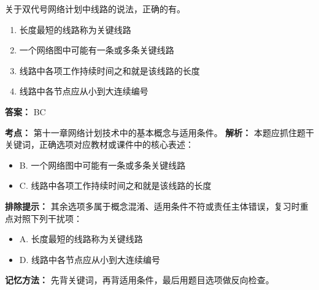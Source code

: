 \documentclass[UTF8,fontset=fandol,11pt]{ctexart}
\begin{document}
\begin{quizbox}[title={第 12 题}]
关于双代号网络计划中线路的说法，正确的有。\\
\begin{enumerate}[label=\Alph*.]
\item 长度最短的线路称为关键线路
\item 一个网络图中可能有一条或多条关键线路
\item 线路中各项工作持续时间之和就是该线路的长度
\item 线路中各节点应从小到大连续编号
\end{enumerate}
\textbf{答案：} BC
\vspace{0.25em}
\begin{answerbox}[title={考点解析}]
\textbf{考点：} 第十一章网络计划技术中的基本概念与适用条件。
\textbf{解析：} 本题应抓住题干关键词，正确选项对应教材或课件中的核心表述：
\begin{itemize}
\item B. 一个网络图中可能有一条或多条关键线路
\item C. 线路中各项工作持续时间之和就是该线路的长度
\end{itemize}
\textbf{排除提示：} 其余选项多属于概念混淆、适用条件不符或责任主体错误，复习时重点对照下列干扰项：
\begin{itemize}
\item A. 长度最短的线路称为关键线路
\item D. 线路中各节点应从小到大连续编号
\end{itemize}
\textbf{记忆方法：} 先背关键词，再背适用条件，最后用题目选项做反向检查。
\end{answerbox}
\end{quizbox}
\end{document}
